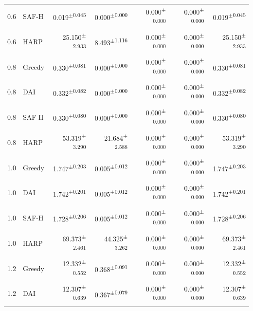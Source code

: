 \documentclass[final,5p]{elsarticle}
\begin{document}
\begin{table}[p]
\begin{tabular}{llrrrrr}
0.6 & SAF-H & 0.019\textsuperscript{$\pm$0.045} & 0.000\textsuperscript{$\pm$0.000} & 0.000\textsuperscript{$\pm$0.000} & 0.000\textsuperscript{$\pm$0.000} & 0.019\textsuperscript{$\pm$0.045} \\
0.6 & HARP & 25.150\textsuperscript{$\pm$2.933} & 8.493\textsuperscript{$\pm$1.116} & 0.000\textsuperscript{$\pm$0.000} & 0.000\textsuperscript{$\pm$0.000} & 25.150\textsuperscript{$\pm$2.933} \\
0.8 & Greedy & 0.330\textsuperscript{$\pm$0.081} & 0.000\textsuperscript{$\pm$0.000} & 0.000\textsuperscript{$\pm$0.000} & 0.000\textsuperscript{$\pm$0.000} & 0.330\textsuperscript{$\pm$0.081} \\
0.8 & DAI & 0.332\textsuperscript{$\pm$0.082} & 0.000\textsuperscript{$\pm$0.000} & 0.000\textsuperscript{$\pm$0.000} & 0.000\textsuperscript{$\pm$0.000} & 0.332\textsuperscript{$\pm$0.082} \\
0.8 & SAF-H & 0.330\textsuperscript{$\pm$0.080} & 0.000\textsuperscript{$\pm$0.000} & 0.000\textsuperscript{$\pm$0.000} & 0.000\textsuperscript{$\pm$0.000} & 0.330\textsuperscript{$\pm$0.080} \\
0.8 & HARP & 53.319\textsuperscript{$\pm$3.290} & 21.684\textsuperscript{$\pm$2.588} & 0.000\textsuperscript{$\pm$0.000} & 0.000\textsuperscript{$\pm$0.000} & 53.319\textsuperscript{$\pm$3.290} \\
1.0 & Greedy & 1.747\textsuperscript{$\pm$0.203} & 0.005\textsuperscript{$\pm$0.012} & 0.000\textsuperscript{$\pm$0.000} & 0.000\textsuperscript{$\pm$0.000} & 1.747\textsuperscript{$\pm$0.203} \\
1.0 & DAI & 1.742\textsuperscript{$\pm$0.201} & 0.005\textsuperscript{$\pm$0.012} & 0.000\textsuperscript{$\pm$0.000} & 0.000\textsuperscript{$\pm$0.000} & 1.742\textsuperscript{$\pm$0.201} \\
1.0 & SAF-H & 1.728\textsuperscript{$\pm$0.206} & 0.005\textsuperscript{$\pm$0.012} & 0.000\textsuperscript{$\pm$0.000} & 0.000\textsuperscript{$\pm$0.000} & 1.728\textsuperscript{$\pm$0.206} \\
1.0 & HARP & 69.373\textsuperscript{$\pm$2.461} & 44.325\textsuperscript{$\pm$3.262} & 0.000\textsuperscript{$\pm$0.000} & 0.000\textsuperscript{$\pm$0.000} & 69.373\textsuperscript{$\pm$2.461} \\
1.2 & Greedy & 12.332\textsuperscript{$\pm$0.552} & 0.368\textsuperscript{$\pm$0.091} & 0.000\textsuperscript{$\pm$0.000} & 0.000\textsuperscript{$\pm$0.000} & 12.332\textsuperscript{$\pm$0.552} \\
1.2 & DAI & 12.307\textsuperscript{$\pm$0.639} & 0.367\textsuperscript{$\pm$0.079} & 0.000\textsuperscript{$\pm$0.000} & 0.000\textsuperscript{$\pm$0.000} & 12.307\textsuperscript{$\pm$0.639} \\

\end{tabular}
\end{table}
\end{document}
